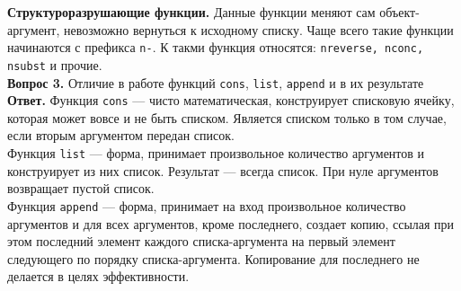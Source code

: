 \documentclass[12pt]{report}
\begin{document}
\indent \textbf{Структуроразрушающие функции.} Данные функции меняют сам объект-аргумент, невозможно вернуться к исходному списку. Чаще всего такие функции начинаются с префикса \texttt{n-}. К такми функция относятся: \texttt{nreverse, nconc, nsubst} и прочие.\\

\textbf{Вопрос 3.} Отличие в работе функций \texttt{cons}, \texttt{list}, \texttt{append} и в их результате\\
\indent\textbf{Ответ. }Функция \texttt{cons} --- чисто математическая, конструирует списковую ячейку, которая может вовсе и не быть списком. Является списком только в том случае, если вторым аргументом передан список.\\

Функция \texttt{list} --- форма, принимает произвольное количество аргументов и конструирует из них список. Результат --- всегда список. При нуле аргументов возвращает пустой список.\\

Функция \texttt{append} --- форма, принимает на вход произвольное количество аргументов и для всех аргументов, кроме последнего, создает копию, ссылая при этом последний элемент каждого списка-аргумента на первый элемент следующего по порядку списка-аргумента. Копирование для последнего не делается в целях эффективности.\\

	
	
	
	
\end{document}
